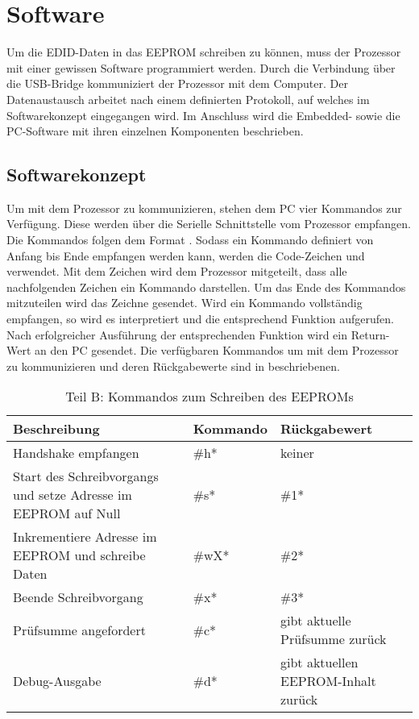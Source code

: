 \section{Software}
\label{sec:TeilB_Software}
Um die EDID-Daten in das EEPROM schreiben zu können, muss der Prozessor mit einer gewissen Software programmiert werden. Durch die Verbindung über die USB-Bridge kommuniziert der Prozessor mit dem Computer. Der Datenaustausch arbeitet nach einem definierten Protokoll, auf welches im Softwarekonzept eingegangen wird. Im Anschluss wird die Embedded- sowie die PC-Software mit ihren einzelnen Komponenten beschrieben. 
\subsection{Softwarekonzept}
\label{softwarekonzept}
Um mit dem Prozessor zu kommunizieren, stehen dem PC vier Kommandos zur Verfügung. Diese werden über die Serielle Schnittstelle vom Prozessor empfangen. Die Kommandos folgen dem Format . Sodass ein Kommando definiert von Anfang bis Ende empfangen werden kann, werden die Code-Zeichen \code{\#} und \code{\*} verwendet. Mit dem Zeichen \code{\#} wird dem Prozessor mitgeteilt, dass alle nachfolgenden Zeichen ein Kommando darstellen. Um das Ende des Kommandos mitzuteilen wird das Zeichne \code{\*} gesendet. Wird ein Kommando vollständig empfangen, so wird es interpretiert und die entsprechend Funktion aufgerufen. Nach erfolgreicher Ausführung der entsprechenden Funktion wird ein Return-Wert an den PC gesendet. Die verfügbaren Kommandos um mit dem Prozessor zu kommunizieren und deren Rückgabewerte sind in  beschriebenen.
\begin{table}[h]
\begin{tabular}{|p{6.5cm}|p{2.5cm}|p{3.5cm}|}\hline
\rowcolor{TableBackgroundColor} 
   \textbf{Beschreibung} & \textbf{Kommando} & \textbf{Rückgabewert}	\\ \hline
	Handshake empfangen & \#h* & keiner \\ \hline    
    Start des Schreibvorgangs und setze Adresse im EEPROM auf Null & \#s* & \#1* \\ \hline
    Inkrementiere Adresse im EEPROM und schreibe Daten& \#wX* & \#2* \\ \hline
    Beende Schreibvorgang & \#x* & \#3* \\ \hline
	Prüfsumme angefordert & \#c* & gibt aktuelle Prüfsumme zurück\\ \hline    
    Debug-Ausgabe & \#d* & gibt aktuellen EEPROM-Inhalt zurück\\ \hline
\end{tabular}
\caption{Teil B: Kommandos zum Schreiben des EEPROMs}
\label{tab:avr_commands}
\end{table} \\
